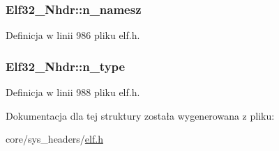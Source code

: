 \hypertarget{struct_elf32___nhdr_a8e6389f882a5c695518a833b4c1bd9c6}{
\subsubsection[{n\-\_\-namesz}]{ Elf32\-\_\-\-Nhdr\-::n\-\_\-namesz}}\label{struct_elf32___nhdr_a8e6389f882a5c695518a833b4c1bd9c6}


Definicja w linii 986 pliku elf.\-h.

\hypertarget{struct_elf32___nhdr_afdab20b47522cb964500a200ceb92462}{
\subsubsection[{n\-\_\-type}]{ Elf32\-\_\-\-Nhdr\-::n\-\_\-type}}\label{struct_elf32___nhdr_afdab20b47522cb964500a200ceb92462}


Definicja w linii 988 pliku elf.\-h.



Dokumentacja dla tej struktury została wygenerowana z pliku\-:\begin{DoxyCompactItemize}
\item 
core/sys\-\_\-headers/\hyperlink{elf_8h}{elf.\-h}\end{DoxyCompactItemize}
